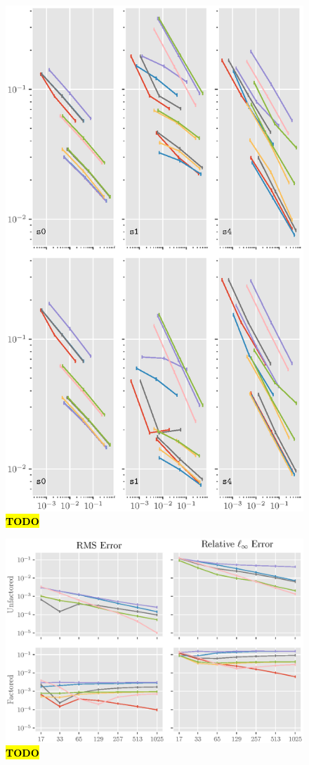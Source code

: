 \documentclass[sisc-eikonal.tex]{subfiles}
\begin{document}
\begin{figure}[H]
  \centering
  \includegraphics[width=\linewidth]{plots_3d.eps}
  \caption{\hl{\textbf{TODO}}}
\end{figure}

\begin{figure}[H]
  \centering
  \includegraphics[width=\linewidth]{qv_plots_2d.eps}
  \caption{\hl{\textbf{TODO}}}
\end{figure}
\end{document}

